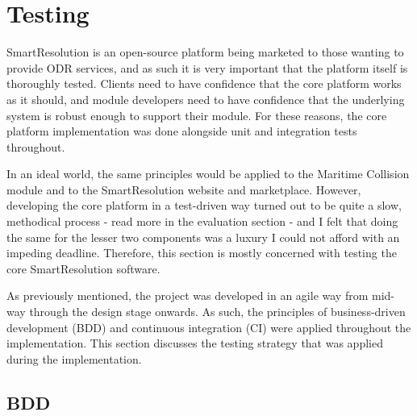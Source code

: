 \chapter{Testing} %

SmartResolution is an open-source platform being marketed to those wanting to provide ODR services, and as such it is very important that the platform itself is thoroughly tested. Clients need to have confidence that the core platform works as it should, and module developers need to have confidence that the underlying system is robust enough to support their module. For these reasons, the core platform implementation was done alongside unit and integration tests throughout.

In an ideal world, the same principles would be applied to the Maritime Collision module and to the SmartResolution website and marketplace. However, developing the core platform in a test-driven way turned out to be quite a slow, methodical process - read more in the evaluation section - and I felt that doing the same for the lesser two components was a luxury I could not afford with an impeding deadline. Therefore, this section is mostly concerned with testing the core SmartResolution software.

As previously mentioned, the project was developed in an agile way from mid-way through the design stage onwards. As such, the principles of business-driven development (BDD) and continuous integration (CI) were applied throughout the implementation. This section discusses the testing strategy that was applied during the implementation.

\section{BDD}

